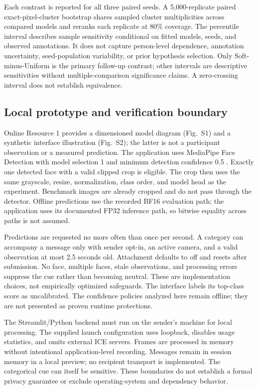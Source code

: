 \documentclass[pdflatex,sn-mathphys-num]{sn-jnl}
\begin{document}
Each contrast is reported for all three paired seeds. A 5,000-replicate paired exact-pixel-cluster bootstrap shares sampled cluster multiplicities across compared models and reranks each replicate at 80\% coverage. The percentile interval describes sample sensitivity conditional on fitted models, seeds, and observed annotations. It does not capture person-level dependence, annotation uncertainty, seed-population variability, or prior hypothesis selection. Only Soft-minus-Uniform is the primary follow-up contrast; other intervals are descriptive sensitivities without multiple-comparison significance claims. A zero-crossing interval does not establish equivalence.

\subsection{Local prototype and verification boundary}
Online Resource 1 provides a dimensioned model diagram (Fig.~S1) and a synthetic interface illustration (Fig.~S2); the latter is not a participant observation or a measured prediction.
The application uses MediaPipe Face Detection with model selection 1 and minimum detection confidence 0.5 \cite{lugaresi2019mediapipe}. Exactly one detected face with a valid clipped crop is eligible. The crop then uses the same grayscale, resize, normalization, class order, and model head as the experiment. Benchmark images are already cropped and do not pass through the detector. Offline predictions use the recorded BF16 evaluation path; the application uses its documented FP32 inference path, so bitwise equality across paths is not assumed.

Predictions are requested no more often than once per second. A category can accompany a message only with sender opt-in, an active camera, and a valid observation at most 2.5 seconds old. Attachment defaults to off and resets after submission. No face, multiple faces, stale observations, and processing errors suppress the cue rather than becoming neutral. These are implementation choices, not empirically optimized safeguards. The interface labels its top-class score as uncalibrated. The confidence policies analyzed here remain offline; they are not presented as proven runtime protections.

The Streamlit/Python backend must run on the sender's machine for local processing. The supplied launch configuration uses loopback, disables usage statistics, and omits external ICE servers. Frames are processed in memory without intentional application-level recording. Messages remain in session memory in a local preview; no recipient transport is implemented. The categorical cue can itself be sensitive. These boundaries do not establish a formal privacy guarantee or exclude operating-system and dependency behavior.
\end{document}
